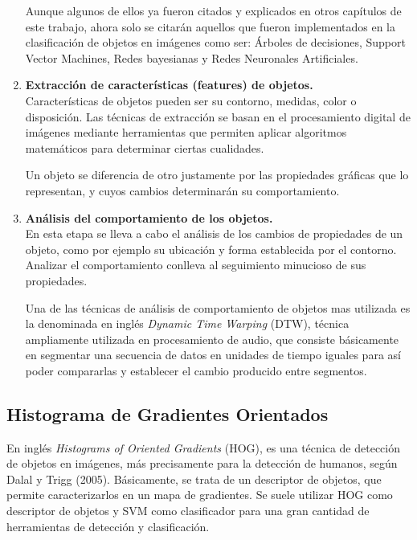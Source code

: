 \documentclass[a4paper,12pt,oneside,spanish]{book}
\begin{document}
\begin{enumerate}[label=\alph*)]
		Aunque algunos de ellos ya fueron citados y explicados en otros capítulos de este trabajo, ahora solo se citarán aquellos que fueron implementados en la clasificación de objetos en imágenes como ser: Árboles de decisiones, Support Vector Machines, Redes bayesianas y Redes Neuronales Artificiales.\par
	\item \textbf{Extracción de características (features) de objetos.}\\
		Características de objetos pueden ser su contorno, medidas, color o disposición. Las técnicas de extracción se basan en el procesamiento digital de imágenes mediante herramientas que permiten aplicar algoritmos matemáticos para determinar ciertas cualidades.\par
		Un objeto se diferencia de otro justamente por las propiedades gráficas que lo representan, y cuyos cambios determinarán su comportamiento.\par
	\item \textbf{Análisis del comportamiento de los objetos.}\\
		En esta etapa se lleva a cabo el análisis de los cambios de propiedades de un objeto, como por ejemplo su ubicación y forma establecida por el contorno. Analizar el comportamiento conlleva al seguimiento minucioso de sus propiedades.\par
		Una de las técnicas de análisis de comportamiento de objetos mas utilizada es la denominada en inglés \textit{Dynamic Time Warping} (DTW), técnica ampliamente utilizada en procesamiento de audio, que consiste básicamente en segmentar una secuencia de datos en unidades de tiempo iguales para así poder compararlas y establecer el cambio producido entre segmentos.\par 
\end{enumerate}

\subsection{Histograma de Gradientes Orientados}
En inglés \textit{Histograms of Oriented Gradients} (HOG), es una técnica de detección de objetos en imágenes, más precisamente para la detección de humanos, según Dalal y Trigg (2005). Básicamente, se trata de un descriptor de objetos, que permite caracterizarlos en un mapa de gradientes. Se suele utilizar HOG como descriptor de objetos y SVM como clasificador para una gran cantidad de herramientas de detección y clasificación.\par
\end{document}
